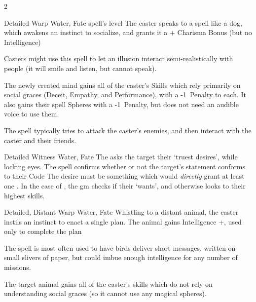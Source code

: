 \begin{multicols}{2}



  {Detailed}%
  {Warp}%
  {Water, Fate}%
  {spell's level}%
  {The caster speaks to a spell like a dog, which awakens an instinct to socialize, and grants it a + Charisma Bonus (but no Intelligence)}%
  {
    Casters might use this spell to let an illusion interact semi-realistically with people (it will smile and listen, but cannot speak).

    The newly created mind gains all of the caster's Skills which rely primarily on social graces (Deceit, Empathy, and Performance), with a -1~Penalty to each.
    It also gains their spell Spheres with a -1~Penalty, but does not need an audible voice to use them.

    The spell typically tries to attack the caster's enemies, and then interact with the caster and their friends.

  }

  {Detailed}%
  {Witness}%
  {Water, Fate}%
  {}%
  {The  asks the target their `truest desires', while locking eyes.
    The spell confirms whether or not the target's statement conforms to their Code}%
  {%
    The desire must be something which would \textit{directly} grant at least one .%
    In the case of , the \gls{gm} checks if their `wants', and otherwise looks to their highest \glspl{skill}.
  }

\label{carrierCrow}
  {Detailed, Distant}%
  {Warp}%
  {Water, Fate}%
  {}%
  {Whistling to a distant animal, the caster instils an instinct to enact a single plan.
  The animal gains Intelligence +, used only to complete the plan}%
  {
  The spell is most often used to have birds deliver short messages, written on small slivers of paper, but could imbue enough intelligence for any number of missions.

  The target animal gains all of the caster's \glspl{skill} which do not rely on understanding social graces (so it cannot use any magical \glspl{sphere}).

}
\end{multicols}
